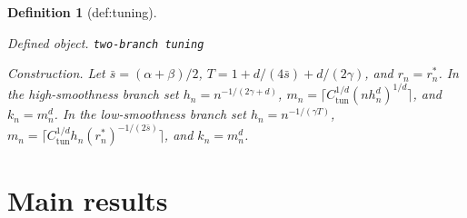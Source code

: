 \documentclass{article}
\newtheorem{definition}{Definition}
\begin{document}
\begin{definition}[def:tuning]\label{def:tuning}
\par\smallskip\noindent\emph{Defined object.} \texttt{two-\allowbreak{}branch tuning}
\par\smallskip\noindent\emph{Construction.} Let \(\bar s=(\alpha+\beta)/2\), \(T=1+d/(4\bar s)+d/(2\gamma)\), and \(r_n=r_n^*\). In the high-smoothness branch set \(h_n=n^{-1/(2\gamma+d)}\), \(m_n=\lceil C_{\mathrm{tun}}^{1/d}(nh_n^d)^{1/d}\rceil\), and \(k_n=m_n^d\). In the low-smoothness branch set \(h_n=n^{-1/(\gamma T)}\), \(m_n=\lceil C_{\mathrm{tun}}^{1/d}h_n(r_n^*)^{-1/(2\bar s)}\rceil\), and \(k_n=m_n^d\).
\end{definition}

\section{Main results}
\end{document}
